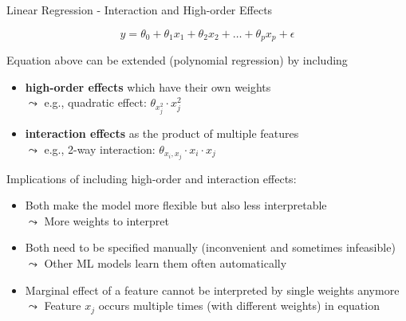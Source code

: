 \documentclass[11pt,compress,t,notes=noshow, aspectratio=169, xcolor=table]{beamer}
\begin{document}
\begin{frame}{Linear Regression - Interaction and High-order Effects}

$$y = \theta_0 + \theta_1 x_1 + \theta_2 x_2 + \dots + \theta_p x_p + \epsilon$$

Equation above can be extended (polynomial regression) by including

\begin{itemize}
\item \textbf{high-order effects} which have their own weights\\
$\leadsto$ e.g., quadratic effect: $\theta_{x_j^2} \cdot x_j^2$
\item \textbf{interaction effects} as the product of multiple features\\
$\leadsto$ e.g., 2-way interaction: $\theta_{x_i, x_j} \cdot x_i \cdot x_j$
\end{itemize}
\pause
Implications of including high-order and interaction effects: 
\begin{itemize}
    \item Both make the model more flexible but also less interpretable\\
    $\leadsto$ More weights to interpret
    \item Both need to be specified manually (inconvenient and sometimes infeasible)\\
    $\leadsto$ Other ML models learn them often automatically
    \item Marginal effect of a feature cannot be interpreted by single weights anymore\\
$\leadsto$ Feature $x_j$ occurs multiple times (with different weights) in equation
\end{itemize}


\end{frame}


\end{document}
